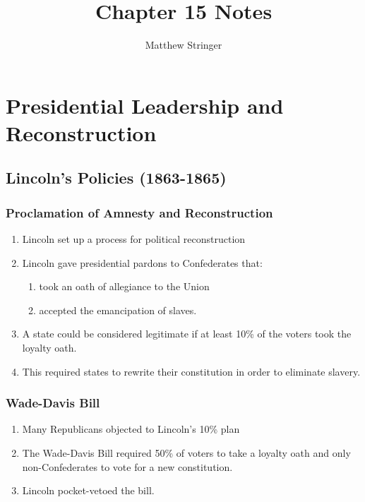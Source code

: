 \documentclass[12pt]{article} %
\title{Chapter 15 Notes} %
\author{Matthew Stringer} %
\begin{document}
\maketitle
\tableofcontents
\newpage

\section{Presidential Leadership and Reconstruction}
\subsection{Lincoln's Policies (1863-1865)}
\subsubsection{Proclamation of Amnesty and Reconstruction}
\begin{enumerate}
	\item Lincoln set up a process for political reconstruction
	\item Lincoln gave presidential pardons to Confederates that:
	\begin{enumerate}
		\item took an oath of allegiance to the Union
		\item accepted the emancipation of slaves.
	\end{enumerate}
	\item A state could be considered legitimate if at least 10\% of the voters took the loyalty oath.
	\item This required states to rewrite their constitution in order to eliminate slavery.
\end{enumerate}

\subsubsection{Wade-Davis Bill}
\begin{enumerate}
	\item Many Republicans objected to Lincoln's 10\% plan
	\item The Wade-Davis Bill required 50\% of voters to take a loyalty oath and only non-Confederates
		to vote for a new constitution.
	\item Lincoln pocket-vetoed the bill.
\end{enumerate}
\end{document}

